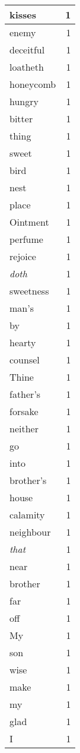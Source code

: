 \begin{center}
\begin{longtable}{l|r}
kisses & 1\\ \hline 
enemy & 1\\ \hline 
deceitful & 1\\ \hline 
loatheth & 1\\ \hline 
honeycomb & 1\\ \hline 
hungry & 1\\ \hline 
bitter & 1\\ \hline 
thing & 1\\ \hline 
sweet & 1\\ \hline 
bird & 1\\ \hline 
nest & 1\\ \hline 
place & 1\\ \hline 
Ointment & 1\\ \hline 
perfume & 1\\ \hline 
rejoice & 1\\ \hline 
\emph{doth} & 1\\ \hline 
sweetness & 1\\ \hline 
man's & 1\\ \hline 
by & 1\\ \hline 
hearty & 1\\ \hline 
counsel & 1\\ \hline 
Thine & 1\\ \hline 
father's & 1\\ \hline 
forsake & 1\\ \hline 
neither & 1\\ \hline 
go & 1\\ \hline 
into & 1\\ \hline 
brother's & 1\\ \hline 
house & 1\\ \hline 
calamity & 1\\ \hline 
neighbour & 1\\ \hline 
\emph{that} & 1\\ \hline 
near & 1\\ \hline 
brother & 1\\ \hline 
far & 1\\ \hline 
off & 1\\ \hline 
My & 1\\ \hline 
son & 1\\ \hline 
wise & 1\\ \hline 
make & 1\\ \hline 
my & 1\\ \hline 
glad & 1\\ \hline 
I & 1\\ \hline 

\end{longtable}
\end{center}
